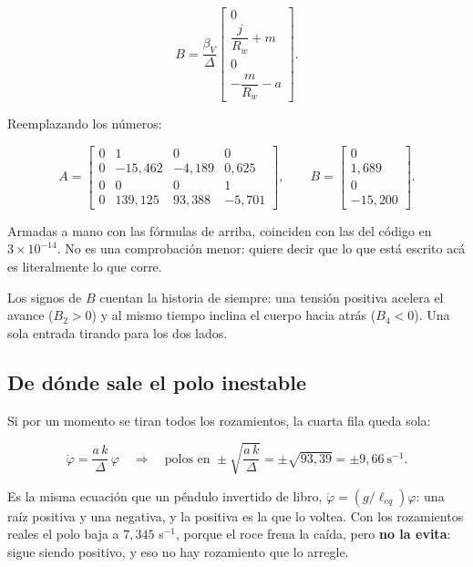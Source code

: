 \documentclass[11pt,a4paper]{report}
\begin{document}
\begin{equation}
B = \frac{\beta_V}{\Delta}
\begin{bmatrix} 0 \\[2pt] \dfrac{j}{R_w} + m \\[8pt] 0 \\[2pt] -\dfrac{m}{R_w} - a \end{bmatrix}.
\end{equation}

Reemplazando los números:

\begin{equation}
A = \begin{bmatrix}
0 & 1 & 0 & 0\\
0 & -15{,}462 & -4{,}189 & 0{,}625\\
0 & 0 & 0 & 1\\
0 & 139{,}125 & 93{,}388 & -5{,}701
\end{bmatrix},
\qquad
B = \begin{bmatrix} 0 \\ 1{,}689 \\ 0 \\ -15{,}200 \end{bmatrix}.
\end{equation}

Armadas a mano con las fórmulas de arriba, coinciden con las del código en
$3\times10^{-14}$. No es una comprobación menor: quiere decir que lo que está escrito acá es
literalmente lo que corre.

\begin{idea}
Los signos de $B$ cuentan la historia de siempre: una tensión positiva acelera el avance
($B_2 > 0$) y al mismo tiempo inclina el cuerpo hacia atrás ($B_4 < 0$). Una sola entrada
tirando para los dos lados.
\end{idea}

\subsection{De dónde sale el polo inestable}

Si por un momento se tiran todos los rozamientos, la cuarta fila queda sola:

\begin{equation}
\ddot\varphi = \frac{a\,k}{\Delta}\,\varphi
\quad\Longrightarrow\quad
\text{polos en } \pm\sqrt{\frac{a\,k}{\Delta}} = \pm\sqrt{93{,}39} = \pm 9{,}66\ \text{s}^{-1}.
\end{equation}

Es la misma ecuación que un péndulo invertido de libro, $\ddot\varphi = (g/\ell_{eq})\varphi$:
una raíz positiva y una negativa, y la positiva es la que lo voltea. Con los rozamientos reales
el polo baja a $7{,}345$ s$^{-1}$, porque el roce frena la caída, pero \textbf{no la evita}:
sigue siendo positivo, y eso no hay rozamiento que lo arregle.
\end{document}
